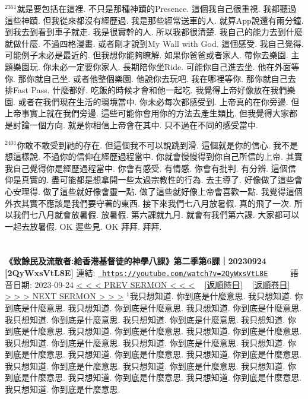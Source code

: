 \documentclass{book}
\begin{document}
$^{2361}$就是要包括在這裡.
不只是那種神蹟的Presence.
這個我自己很重視.
我都聽過這些神蹟.
但我從來都沒有經歷過.
我是那些經常送車的人.
就算App說還有兩分鐘.
到我去到看到車子就走.
我是很實幹的人.
所以我都很清楚.
我自己的能力去到什麼就做什麼.
不過四格漫畫.
或者剛才說到My Wall with God.
這個感受.
我自己覺得.
可能例子未必是最近的.
但我想你能夠瞭解.
如果你爸爸或者家人.
帶你去樂園.
主題樂園玩.
你未必一定要你家人.
長期陪你坐Ride.
可能你自己進去坐.
他在外面等你.
那你就自己坐.
或者他整個樂園.
他說你去玩吧.
我在哪裡等你.
那你就自己去排Fast Pass.
什麼都好.
吃飯的時候才會和他一起吃.
我覺得上帝好像放在我們樂園.
或者在我們現在生活的環境當中.
你未必每次都感受到.
上帝真的在你旁邊.
但上帝事實上就在我們旁邊.
這些可能你會用你的方法去產生類比.
但我覺得大家都是討論一個方向.
就是你相信上帝會在其中.
只不過在不同的感受當中.

$^{2401}$你敢不敢受到祂的存在.
但這個我不可以說跳到滑.
這個就是你的信心.
我不是想這樣說.
不過你的信仰在經歷過程當中.
你就會慢慢得到你自己所信的上帝.
其實我自己覺得你是經歷過程當中.
你會有感受.
有情感.
你會有批判.
有分辨.
這個信仰是真實的.
盡可能都是想拿開一些太過宗教性的行為.
去主導了.
好像做了這些會心安理得.
做了這些就好像會靈一點.
做了這些就好像上帝會喜歡一點.
我覺得這個外衣其實不應該是我們要守著的東西.
接下來我們七八月放暑假.
真的飛了一次.
所以我們七八月就會放暑假.
放暑假.
第六課就九月.
就會有我們第六課.
大家都可以一起去放暑假.
OK 遲些見.
OK 拜拜.
拜拜.
\newpage



\section{}
\label{sec:2QyWxsVtL8E}
\textbf{《致餘民及流散者:給香港基督徒的神學八課》第二季第6課｜20230924 [2QyWxsVtL8E]}
\newline
\newline
連結: \href{https://youtube.com/watch?v=2QyWxsVtL8E}{\texttt{ https://youtube.com/watch?v=2QyWxsVtL8E}} ~~~~ 語音日期: 2023-09-24 
\newline
\newline
\hyperref[sec:5EgvGimlwXk]{\small{< < < PREV SERMON < < <}}
~
\hyperref[sec:index_chronic]{\small{[返順時目]}}
~
\hyperref[sec:index_scriptual]{\small{[返順卷目]}}
~
\hyperref[sec:JxHW7ujVbSI]{\small{> > > NEXT SERMON > > >}}
\newline
\newline
$^{1}$我只想知道.
你到底是什麼意思.
我只想知道.
你到底是什麼意思.
我只想知道.
你到底是什麼意思.
我只想知道.
你到底是什麼意思.
我只想知道.
你到底是什麼意思.
我只想知道.
你到底是什麼意思.
我只想知道.
你到底是什麼意思.
我只想知道.
你到底是什麼意思.
我只想知道.
你到底是什麼意思.
我只想知道.
你到底是什麼意思.
我只想知道.
你到底是什麼意思.
我只想知道.
你到底是什麼意思.
我只想知道.
你到底是什麼意思.
我只想知道.
你到底是什麼意思.
我只想知道.
你到底是什麼意思.
我只想知道.
你到底是什麼意思.
我只想知道.
你到底是什麼意思.
我只想知道.
你到底是什麼意思.
我只想知道.
你到底是什麼意思.
我只想知道.
你到底是什麼意思.
\end{document}

